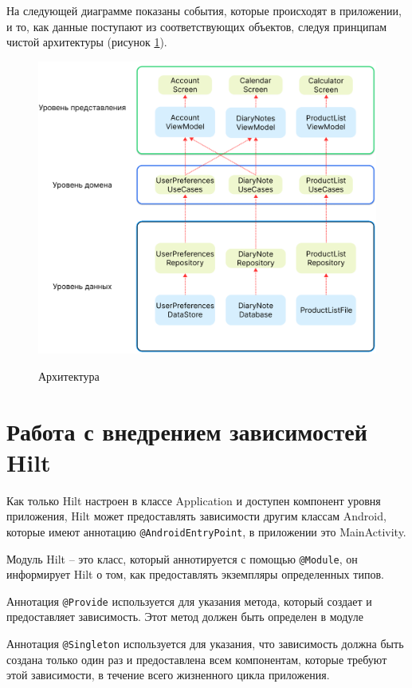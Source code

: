 На следующей диаграмме показаны события, которые происходят в приложении, и то, как данные поступают из соответствующих объектов, следуя принципам чистой архитектуры (рисунок \ref{fig:AppArch}).

\begin{figure}[h!]
    \begin{center}
        \includegraphics[width=0.9\hsize]{fig/AppArch.png}\\[2mm]
        \caption{Архитектура }\label{fig:AppArch}
    \end{center}
\end{figure}


\section{Работа с внедрением зависимостей Hilt}

Как только Hilt настроен в классе Application и доступен компонент уровня приложения, Hilt может предоставлять зависимости другим классам Android, которые имеют аннотацию \verb|@AndroidEntryPoint|, в приложении это MainActivity.

Модуль Hilt -- это класс, который аннотируется с помощью \verb|@Module|, он информирует Hilt о том, как предоставлять экземпляры определенных типов.

Аннотация \verb|@Provide| используется для указания метода, который создает и предоставляет зависимость. Этот метод должен быть определен в модуле

Аннотация \verb|@Singleton| используется для указания, что зависимость должна быть создана только один раз и предоставлена всем компонентам, которые требуют этой зависимости, в течение всего жизненного цикла приложения.

